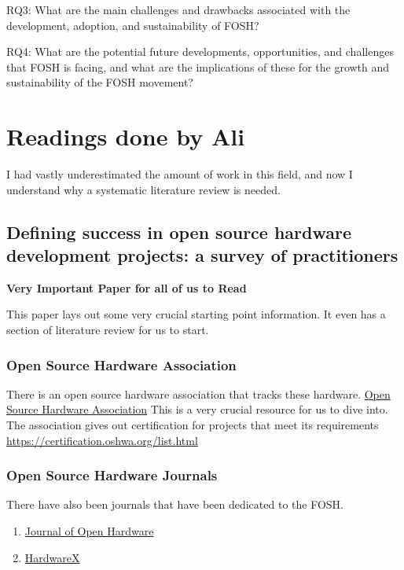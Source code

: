 \documentclass{article}
\begin{document}
RQ3: What are the main challenges and drawbacks associated with the development, adoption, and sustainability of FOSH?

RQ4: What are the potential future developments, opportunities, and challenges that FOSH is facing, and what are the implications of these for the growth and sustainability of the FOSH movement?


\section{Readings done by Ali}

I had vastly underestimated the amount of work in this field, and now I understand why a systematic literature review is needed.

\subsection{Defining success in open source hardware development projects: a survey of practitioners}
\cite{p1_def_succ}

\textbf{Very Important Paper for all of us to Read}

This paper lays out some very crucial starting point information.
It even has a section of literature review for us to start.

\subsubsection{Open Source Hardware Association}
There is an open source hardware association that tracks these hardware.
\href{https://www.oshwa.org}{Open Source Hardware Association}
This is a very crucial resource for us to dive into. 
The association gives out certification for projects that meet its requirements
\href{https://certification.oshwa.org/list.html}{https://certification.oshwa.org/list.html}

\subsubsection{Open Source Hardware Journals}
There have also been journals that have been dedicated to the FOSH.
\begin{enumerate}
    \item \href{https://openhardware.metajnl.com/}{Journal of Open Hardware}
    \item \href{https://www.sciencedirect.com/journal/hardwarex}{HardwareX}
\end{enumerate}
\end{document}

